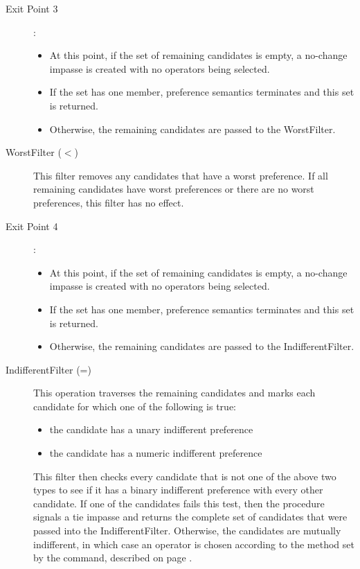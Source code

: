 \begin{description}
	\item[Exit Point 3]:
	\begin{itemize}
		\item At this point, if the set of remaining candidates is empty,
		a no-change impasse is created with no operators being selected.
		\item If  the set has one member, preference semantics terminates 
		and this set is returned.
		\item Otherwise, the remaining candidates are passed to the
		WorstFilter.
	\end{itemize}
	\index{-}
	
	\item[WorstFilter ($<$) ] This filter removes any candidates that have
	a worst preference. If all remaining candidates have worst preferences or there
	are no worst preferences, this filter has no effect.
	
	\item[Exit Point 4]:
	\begin{itemize}
		\item At this point, if the set of remaining candidates is empty,
		a no-change impasse is created with no operators being selected. 
		\item If the set has one member, preference semantics terminates 
		and this set is returned.
		\item Otherwise, the remaining candidates are passed to the
		IndifferentFilter.
	\end{itemize}
	
	\item[IndifferentFilter (=) ] This operation traverses the remaining candidates and marks 
	each candidate for which one of the following is true:
	\begin{itemize}
		\item the candidate has a unary indifferent preference
		\item the candidate has a numeric indifferent preference
	\end{itemize}
	This filter then checks every candidate that is not one of the above two types
	to see if it has a binary indifferent preference with every other candidate.
	If one of the candidates fails this test, then the procedure signals a tie impasse
	and returns the complete set of candidates that were passed into the 
	IndifferentFilter. Otherwise, the candidates are mutually indifferent, in which case 
	an operator is chosen according to the method set by the  
	command, described on page \pageref{decide-indifferent-selection}.
\end{description}

